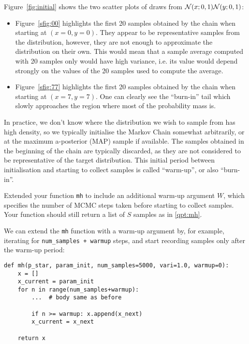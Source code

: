 \begin{exenumerate}
\begin{solution}
Figure~\ref{fig:initial} shows the two scatter plots of draws from $\mathcal{N}(x; 0, 1)\mathcal{N}(y; 0, 1)$:
\begin{itemize}
	\item Figure~\ref{sfig:00} highlights the first 20 samples
          obtained by the chain when starting at $(x=0, y=0)$. They
          appear to be representative samples from the distribution,
          however, they are not enough to approximate the distribution
          on their own. This would mean that a sample average computed
          with 20 samples only would have high variance, i.e. its
          value would depend strongly on the values of the 20 samples
          used to compute the average.
	\item Figure~\ref{sfig:77} highlights the first 20 samples
          obtained by the chain when starting at $(x=7, y=7)$. One can
          clearly see the ``burn-in'' tail which slowly approaches the
          region where most of the probability mass is.
\end{itemize}


\end{solution}

\item In practice, we don't know where the distribution we wish to
  sample from has high density, so we typically initialise the Markov
  Chain somewhat arbitrarily, or at the maximum a-posterior (MAP) sample if
  available. The samples obtained in the beginning of the chain are
  typically discarded, as they are not considered to be representative
  of the target distribution. This initial period between
  initialisation and starting to collect samples is called
  ``warm-up'', or also ``burn-in''.

Extended your function \lstinline|mh| to include an additional warm-up
argument $W$, which specifies the number of MCMC steps taken before
starting to collect samples. Your function should still return a list
of $S$ samples as in \ref{qpt:mh}.

\begin{solution}

We can extend the \lstinline|mh| function with a warm-up argument by, for example, iterating for \lstinline|num_samples + warmup|
steps, and start recording samples only after the warm-up period:
\begin{lstlisting}
def mh(p_star, param_init, num_samples=5000, vari=1.0, warmup=0):
	x = []
	x_current = param_init
	for n in range(num_samples+warmup):
		...  # body same as before
	
		if n >= warmup: x.append(x_next)
		x_current = x_next
	
	return x
\end{lstlisting}
\end{solution}

\end{exenumerate}


